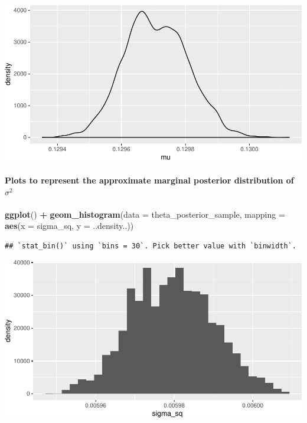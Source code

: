 \documentclass[]{article}
\newenvironment{Shaded}{\begin{snugshade}}{\end{snugshade}}
\newcommand{\KeywordTok}[1]{\textcolor[rgb]{0.13,0.29,0.53}{\textbf{#1}}}
\newcommand{\DataTypeTok}[1]{\textcolor[rgb]{0.13,0.29,0.53}{#1}}
\newcommand{\StringTok}[1]{\textcolor[rgb]{0.31,0.60,0.02}{#1}}
\newcommand{\OperatorTok}[1]{\textcolor[rgb]{0.81,0.36,0.00}{\textbf{#1}}}
\newcommand{\NormalTok}[1]{#1}
\let\oldparagraph\paragraph
\renewcommand{\paragraph}[1]{\oldparagraph{#1}\mbox{}}
\begin{document}
\includegraphics{20190225_bayes_MCMC_Metropolis_files/figure-latex/unnamed-chunk-9-1.pdf}

\newpage

\paragraph{\texorpdfstring{Plots to represent the approximate marginal
posterior distribution of
\(\sigma^2\)}{Plots to represent the approximate marginal posterior distribution of \textbackslash{}sigma\^{}2}}\label{plots-to-represent-the-approximate-marginal-posterior-distribution-of-sigma2}

\begin{Shaded}
\begin{Highlighting}[]
\KeywordTok{ggplot}\NormalTok{() }\OperatorTok{+}
\StringTok{  }\KeywordTok{geom_histogram}\NormalTok{(}\DataTypeTok{data =}\NormalTok{ theta_posterior_sample, }\DataTypeTok{mapping =} \KeywordTok{aes}\NormalTok{(}\DataTypeTok{x =}\NormalTok{ sigma_sq, }\DataTypeTok{y =}\NormalTok{ ..density..))}
\end{Highlighting}
\end{Shaded}

\begin{verbatim}
## `stat_bin()` using `bins = 30`. Pick better value with `binwidth`.
\end{verbatim}

\includegraphics{20190225_bayes_MCMC_Metropolis_files/figure-latex/unnamed-chunk-10-1.pdf}
\end{document}
